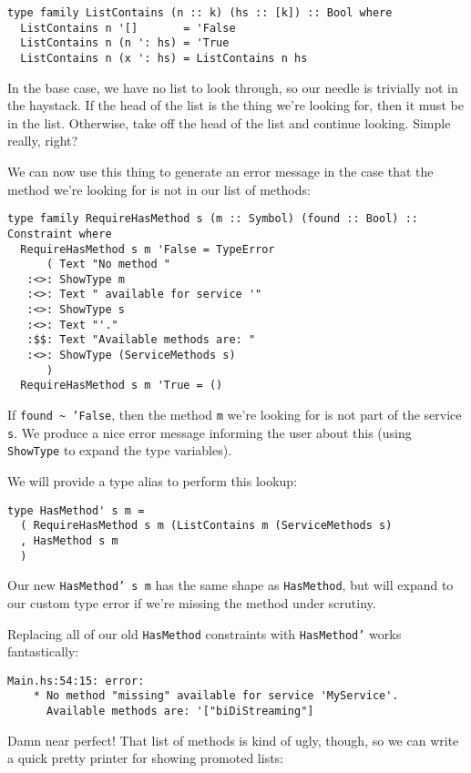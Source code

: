 {\begin{verbatim}
type family ListContains (n :: k) (hs :: [k]) :: Bool where
  ListContains n '[]       = 'False
  ListContains n (n ': hs) = 'True
  ListContains n (x ': hs) = ListContains n hs
\end{verbatim}
In the base case, we have no list to look through, so our needle is trivially not in the haystack. If the head of the list is the thing we're looking for, then it must be in the list. Otherwise, take off the head of the list and continue looking. Simple really, right?

We can now use this thing to generate an error message in the case that the method we're looking for is not in our list of methods:

\begin{verbatim}
type family RequireHasMethod s (m :: Symbol) (found :: Bool) :: Constraint where
  RequireHasMethod s m 'False = TypeError
      ( Text "No method "
   :<>: ShowType m
   :<>: Text " available for service '"
   :<>: ShowType s
   :<>: Text "'."
   :$$: Text "Available methods are: "
   :<>: ShowType (ServiceMethods s)
      )
  RequireHasMethod s m 'True = ()
\end{verbatim}
If \texttt{found \~{} 'False}, then the method \texttt{m} we're looking for is not part of the service \texttt{s}. We produce a nice error message informing the user about this (using \texttt{ShowType} to expand the type variables).

We will provide a type alias to perform this lookup:

\begin{verbatim}
type HasMethod' s m =
  ( RequireHasMethod s m (ListContains m (ServiceMethods s)
  , HasMethod s m
  )
\end{verbatim}
Our new \texttt{HasMethod' s m} has the same shape as \texttt{HasMethod}, but will expand to our custom type error if we're missing the method under scrutiny.

Replacing all of our old \texttt{HasMethod} constraints with \texttt{HasMethod'} works fantastically:

\begin{verbatim}
Main.hs:54:15: error:
    * No method "missing" available for service 'MyService'.
      Available methods are: '["biDiStreaming"]
\end{verbatim}
Damn near perfect! That list of methods is kind of ugly, though, so we can write a quick pretty printer for showing promoted lists:

}
